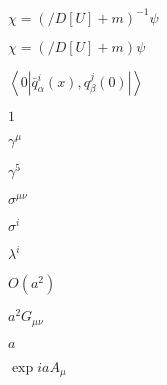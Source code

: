 \documentclass{article}
\begin{document}
$ \chi=(/\!\!\!D[U]+m)^{-1}\psi $
\pagebreak

$ \chi=(/\!\!\!D[U]+m)\psi $
\pagebreak

$ \left<0|\bar q^i_\alpha(x), q^j_\beta(0)|\right> $
\pagebreak

$ 1 $
\pagebreak

$ \gamma^\mu $
\pagebreak

$ \gamma^5 $
\pagebreak

$ \sigma^{\mu\nu} $
\pagebreak

$ \sigma^{i} $
\pagebreak

$ \lambda^{i} $
\pagebreak

$ O(a^2)$
\pagebreak

$ a^2 G_{\mu\nu} $
\pagebreak

$a$
\pagebreak

$ \exp{iaA_{\mu}} $
\pagebreak
\end{document}
